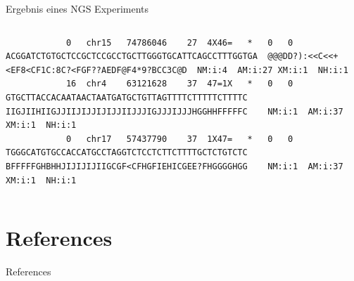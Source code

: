 \documentclass[10pt]{beamer}
\begin{document}
\begin{frame}[fragile]{Ergebnis eines NGS Experiments}
\begin{columns}
\begin{lstlisting}
			0	chr15	74786046	27	4X46=	*	0	0	ACGGATCTGTGCTCCGCTCCGCCTGCTTGGGTGCATTCAGCCTTTGGTGA	@@@DD?):<<C<<+<EF8<CF1C:8C?<FGF??AEDF@F4*9?BCC3C@D	NM:i:4	AM:i:27	XM:i:1	NH:i:1
			16	chr4	63121628	37	47=1X	*	0	0	GTGCTTACCACAATAACTAATGATGCTGTTAGTTTTCTTTTTCTTTTC	IIGJIIHIIGJJIIJIJJIJIJJIIJJJIGJJJIJJJHGGHHFFFFFC	NM:i:1	AM:i:37	XM:i:1	NH:i:1
			0	chr17	57437790	37	1X47=	*	0	0	TGGGCATGTGCCACCATGCCTAGGTCTCCTCTTCTTTTGCTCTGTCTC	BFFFFFGHBHHJIJIJIJIIGCGF<CFHGFIEHICGEE?FHGGGGHGG	NM:i:1	AM:i:37	XM:i:1	NH:i:1
		\end{lstlisting}
	\end{columns}
\end{frame}

\section{References}
\begin{frame}[allowframebreaks]{References}
\begingroup
\renewcommand*{\bibfont}{\footnotesize} 
\printbibliography[heading=none]
\endgroup
\end{frame}
\end{document}
